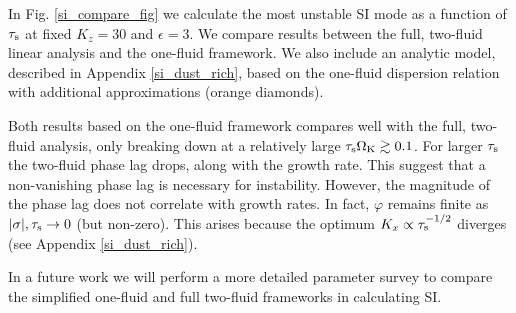 In Fig. \ref{si_compare_fig} we calculate the most unstable SI 
mode as a function of $\tau_\mathrm{s}$ at fixed $K_z=30$ and $\epsilon =3$. We
compare results between the full, two-fluid linear analysis and the
one-fluid framework. We also include an analytic model, described in Appendix 
\ref{si_dust_rich}, based on the one-fluid dispersion relation with 
additional approximations (orange diamonds).

Both results based on the one-fluid framework compares well with the 
full, two-fluid analysis, only breaking down at a relatively large
$\tau_\mathrm{s}\Omega_{\rm K}\gtrsim 0.1$. For larger $\tau_\mathrm{s}$ the two-fluid phase
lag drops, along with the growth rate. This suggest that a
non-vanishing phase lag is necessary for instability. However, the
magnitude of the phase lag does not correlate with growth rates. In
fact, $\varphi$ remains finite as $|\sigma|, \tau_\mathrm{s}\to0$ (but
non-zero). This arises because the optimum $K_x\propto \tau_\mathrm{s}^{-1/2}$
diverges (see Appendix \ref{si_dust_rich}).   

In a future work we will perform a more detailed parameter survey to
compare the simplified one-fluid and full two-fluid frameworks in
calculating SI.  

